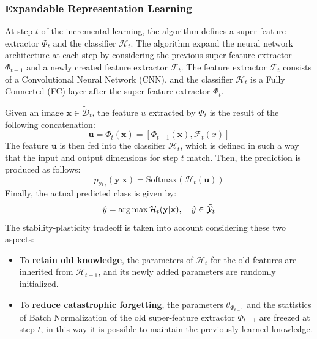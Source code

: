 \subsubsection{Expandable Representation Learning}
At step $t$ of the incremental learning, the algorithm defines a super-feature extractor $\Phi_t$ and the classifier $\mathcal{H}_t$. The algorithm expand the neural network architecture at each step by considering the previous super-feature extractor $\Phi_{t-1}$ and a newly created feature extractor $\mathcal{F}_t$. The feature extractor $\mathcal{F}_t$ consists of a Convolutional Neural Network (CNN), and the classifier $\mathcal{H}_t$ is a Fully Connected (FC) layer after the super-feature extractor $\Phi_t$.

Given an image $\textbf{x} \in \tilde{\mathcal{D}}_t$, the feature $u$ extracted by $\Phi_t$ is the result of the following concatenation:
\begin{equation}
    \textbf{u} = \Phi_t(\textbf{x}) = [\Phi_{t-1}(\textbf{x}), \mathcal{F}_t(x)]
\end{equation}
The feature $\textbf{u}$ is then fed into the classifier $\mathcal{H}_t$, which is defined in such a way that the input and output dimensions for step $t$ match. Then, the prediction is produced as follows:
\begin{equation} \label{eq:classification}
    p_{\mathcal{H}_t}(\textbf{y} | \textbf{x}) = \text{Softmax}(\mathcal{H}_t(\textbf{u}))
\end{equation}
Finally, the actual predicted class is given by:
\begin{equation}
    \hat{y} = \operatorname*{arg\,max} \mathcal{H}_t(\textbf{y} | \textbf{x}), \quad \hat{y} \in \tilde{\mathcal{Y}}_t
\end{equation}
The stability-plasticity tradeoff is taken into account considering these two aspects:
\begin{itemize}
    \item To \textbf{retain old knowledge}, the parameters of $\mathcal{H}_t$ for the old features are inherited from $\mathcal{H}_{t-1}$, and its newly added parameters are randomly initialized.
    \item To \textbf{reduce catastrophic forgetting}, the parameters $\theta_{\Phi_{t-1}}$ and the statistics of Batch Normalization \cite{ioffe2015batch} of the old super-feature extractor $\Phi_{t-1}$ are freezed at step $t$, in this way it is possible to maintain the previously learned knowledge.
\end{itemize}


